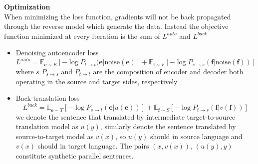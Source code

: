 \textbf{Optimization}\\
When minimizing the loss function, gradients will not be back propagated through the reverse model which generate the data. Instead the objective function minimized at every iteration is the sum of $L^{auto}$ and $L^{back}$
\begin{itemize}
	\item Denoising autoencoder loss
	\[ L^{auto} = \mathbb{E}_{\bm{e}\sim E}[-\log P_{t\rightarrow t}(\bm{e}|\text{noise}(\bm{e})] + \mathbb{E}_{\bm{f}\sim F} [-\log P_{s\rightarrow s}(\bm{f}|\text{noise}(\bm{f}))]\]
	where $s$ $P_{s\rightarrow s}$ and $P_{t\rightarrow t}$ are the composition of encoder and decoder both operating in the source and target sides, respectively
	\item Back-translation loss
	\[ L^{back} = \mathbb{E}_{\bm{e}\sim T} [-\log P_{s\rightarrow t}(\bm{e}|u(\bm{e}))] +  \mathbb{E}_{\bm{f}\sim S} [-\log P_{t\rightarrow s}(\bm{f}|v(\bm{f}))]\]
	 we denote the sentence that translated by intermediate target-to-source translation model as $u(y)$, similarly denote the sentence translated by source-to-target model as $v(x)$, so $u(y)$ should in source language and $v(x)$ should in target language. The pairs $(x, v(x))$, $(u(y), y)$ constitute synthetic parallel  sentences.
\end{itemize}










